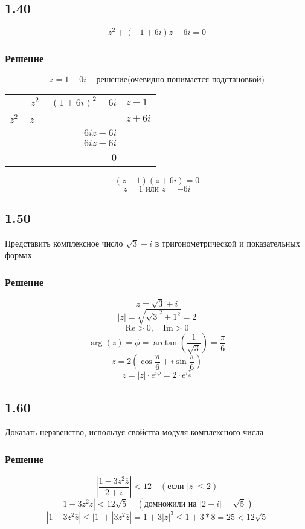 \documentclass[12pt,a4paper]{article}
\begin{document}
\subsection*{1.40}
\[
 z^2+(-1+6i)z-6i=0
\]
\subsubsection*{Решение}
\[
z = 1 + 0i \text{ -- решение(очевидно понимается подстановкой)}
\]
\begin{tabular}{r|l}

$z^2 + (1 + 6i)^2 - 6i$ & $z-1$ \\
\cline{2-2}
$z^2-z$~~~~~~~~~~~~~~~~~& $z+6i $ \\
\cline{1-1}
$6iz - 6i$ & \\
$6iz - 6i$ & \\
\cline{1-1}
0&\\
\end{tabular}
\[
(z-1)(z + 6i) = 0
\]
\[
z = 1 \text{ или } z = -6i
\]


\subsection*{1.50}

 Представить комплексное число $\sqrt{3}+i$ в тригонометрической и показательных формах

\subsubsection*{Решение}
\[
z = \sqrt{3} + i
\]
\[
|z| = \sqrt{\sqrt{3}^2 + 1^2} = 2
\]
\[
\text{Re} > 0, \quad \text{Im} > 0
\]
\[
\arg(z) = \phi = \arctan\left(\frac{1}{\sqrt{3}}\right) = \frac{\pi}{6}
\]
\[
 z = 2 \left(\cos \frac{\pi}{6} + i \sin \frac{\pi}{6}\right)
\]
\[
z = |z| \cdot e^{i\phi} = 2 \cdot e^{i\frac{\pi}{6}}
\]




\subsection*{1.60}

 Доказать неравенство, используя свойства модуля комплексного числа


\subsubsection*{Решение}
\[
|\frac{1-3z^2\overline{z}}{2+i}| < 12 \quad (\text{если } |z| \leq 2)
\]
\[
|1-3z^2\overline{z}| < 12\sqrt{5} \quad (\text{домножили на } |{2+i}|= \sqrt{5})
\]
\[
|1-3z^2\overline{z}| \leq |1| + |3z^2\overline{z}|=1+3|z|^3 \leq 1+3*8=25 < 12\sqrt{5}
\]
\end{document}
